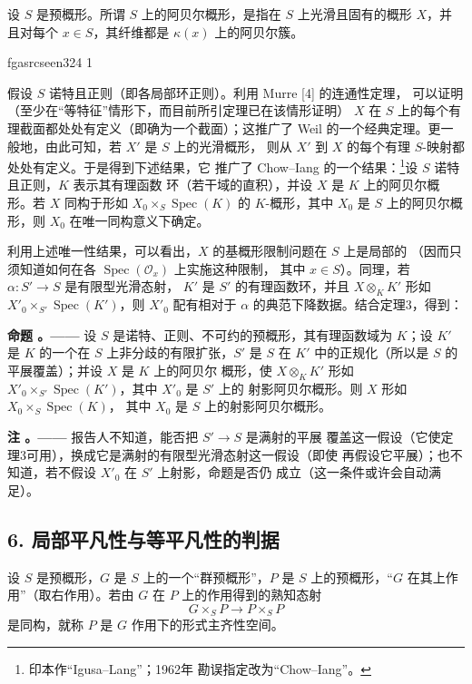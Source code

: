 \documentclass[12pt,twoside,openany]{book}
\numberwithin{equation}{section}
\newcommand{\fgaunitid}{unbound}
\newcommand{\src}[1]{%
  \phantomsection
  \hypertarget{src:\fgaunitid:#1}{}%
  \hypertarget{fga.\fgaunitid.p#1}{}%
  \ifcsname fgasrcseen#1\endcsname\else
    \expandafter\gdef\csname fgasrcseen#1\endcsname{1}%
    \hypertarget{src:#1}{}%
  \fi
  \marginpar{\raggedleft\footnotesize\sffamily #1}%
}
\newcommand{\fquote}[1]{“#1”}
\theoremstyle{plain}
\theoremstyle{definition}
\theoremstyle{remark}
\newcommand{\result}[2]{%
  \par\medskip\noindent\textbf{#1%
  \if\relax\detokenize{#2}\relax\else\space#2\fi。——}\enspace
}
\begin{document}
设 $S$ 是预概形。所谓 $S$ 上的阿贝尔概形，是指在 $S$ 上光滑且固有的概形
$X$，并且对每个 $x\in S$，其纤维都是 $\kappa(x)$ 上的阿贝尔簇。

\src{324}
假设 $S$ 诺特且正则（即各局部环正则）。利用 Murre [4] 的连通性定理，
可以证明（至少在\fquote{等特征}情形下，而目前所引定理已在该情形证明）
$X$ 在 $S$ 上的每个有理截面都处处有定义（即确为一个截面）；这推广了
Weil 的一个经典定理。更一般地，由此可知，若 $X'$ 是 $S$ 上的光滑概形，
则从 $X'$ 到 $X$ 的每个有理 $S$-映射都处处有定义。于是得到下述结果，它
推广了 Chow--Iang 的一个结果：\footnote{印本作\fquote{Igusa--Lang}；1962年
勘误指定改为\fquote{Chow--Iang}。}设 $S$ 诺特且正则，$K$ 表示其有理函数
环（若干域的直积），并设 $X$ 是 $K$ 上的阿贝尔概形。若 $X$ 同构于形如
$X_0\times_S\operatorname{Spec}(K)$ 的 $K$-概形，其中 $X_0$ 是 $S$
上的阿贝尔概形，则 $X_0$ 在唯一同构意义下确定。

利用上述唯一性结果，可以看出，$X$ 的基概形限制问题在 $S$ 上是局部的
（因而只须知道如何在各 $\operatorname{Spec}(\mathcal O_x)$ 上实施这种限制，
其中 $x\in S$）。同理，若 $\alpha:S'\longrightarrow S$ 是有限型光滑态射，
$K'$ 是 $S'$ 的有理函数环，并且 $X\otimes_KK'$ 形如
$X'_0\times_{S'}\operatorname{Spec}(K')$，则 $X'_0$ 配有相对于
$\alpha$ 的典范下降数据。结合定理3，得到：

\result{命题}{5.1} 设 $S$ 是诺特、正则、不可约的预概形，其有理函数域为
$K$；设 $K'$ 是 $K$ 的一个在 $S$ 上非分歧的有限扩张，$S'$ 是 $S$ 在
$K'$ 中的正规化（所以是 $S$ 的平展覆盖）；并设 $X$ 是 $K$ 上的阿贝尔
概形，使 $X\otimes_KK'$ 形如
$X'_0\times_{S'}\operatorname{Spec}(K')$，其中 $X'_0$ 是 $S'$ 上的
射影阿贝尔概形。则 $X$ 形如 $X_0\times_S\operatorname{Spec}(K)$，
其中 $X_0$ 是 $S$ 上的射影阿贝尔概形。

\result{注}{} 报告人不知道，能否把 $S'\longrightarrow S$ 是满射的平展
覆盖这一假设（它使定理3可用），换成它是满射的有限型光滑态射这一假设（即使
再假设它平展）；也不知道，若不假设 $X'_0$ 在 $S'$ 上射影，命题是否仍
成立（这一条件或许会自动满足）。

\subsection*{6. 局部平凡性与等平凡性的判据}

设 $S$ 是预概形，$G$ 是 $S$ 上的一个\fquote{群预概形}，$P$ 是
$S$ 上的预概形，\fquote{$G$ 在其上作用}（取右作用）。若由 $G$ 在 $P$
上的作用得到的熟知态射
\[
  G\times_SP\longrightarrow P\times_SP
\]
是同构，就称 $P$ 是 $G$ 作用下的形式主齐性空间。
\end{document}
